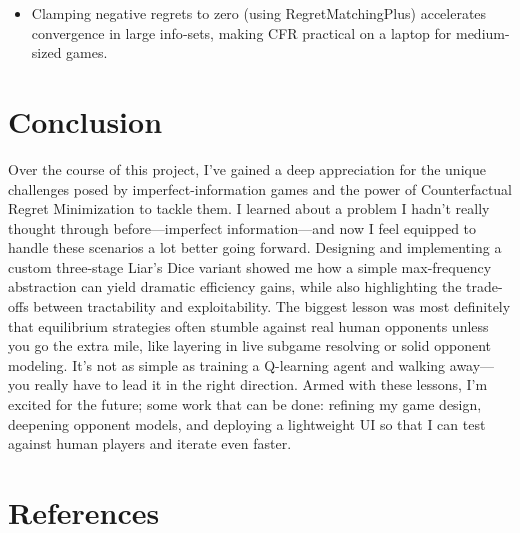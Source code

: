 \documentclass[
]{article}
\begin{document}
\begin{itemize}
\item
  Clamping negative regrets to zero (using RegretMatchingPlus)
  accelerates convergence in large info‐sets, making CFR practical on a
  laptop for medium-sized games.
\end{itemize}

\section*{\texorpdfstring{\textbf{Conclusion}}{Conclusion}}\label{conclusion}

Over the course of this project, I've gained a deep appreciation for the
unique challenges posed by imperfect-information games and the power of
Counterfactual Regret Minimization to tackle them. I learned about a
problem I hadn't really thought through before---imperfect
information---and now I feel equipped to handle these scenarios a lot
better going forward. Designing and implementing a custom three-stage
Liar's Dice variant showed me how a simple max-frequency abstraction can
yield dramatic efficiency gains, while also highlighting the trade-offs
between tractability and exploitability. The biggest lesson was most
definitely that equilibrium strategies often stumble against real human
opponents unless you go the extra mile, like layering in live subgame
resolving or solid opponent modeling. It's not as simple as training a
Q-learning agent and walking away---you really have to lead it in the
right direction. Armed with these lessons, I'm excited for the future;
some work that can be done: refining my game design, deepening opponent
models, and deploying a lightweight UI so that I can test against human
players and iterate even faster.

\section*{\texorpdfstring{\textbf{References}}{References}}\label{references}
\end{document}
